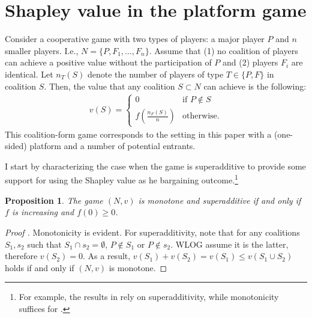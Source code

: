 \documentclass[a4paper]{article}
\newtheorem{proposition}{Proposition}
\begin{document}


\appendix

\printbibliography


\section{Shapley value in the platform game}

Consider a cooperative game with two types of players: a major player $P$ and $n$ smaller players.
I.e., $N = \{P, F_1, \dots, F_n\}$.
Assume that (1) no coalition of players can achieve a positive value without the participation of $P$ and (2) players $F_i$ are identical.
Let $n_T(S)$ denote the number of players of type $T \in \{P, F\}$ in coalition $S$. Then, the value that any coalition $S \subset N$ can achieve is the following:
\begin{align*}
    v(S) = \begin{cases}
        0                              & \text{if } P \notin S \\
        f\left(\frac{n_F(S)}{n}\right) & \text{otherwise}.
    \end{cases}
\end{align*}
This coalition-form game corresponds to the setting in this paper with a (one-sided) platform and a number of potential entrants.

I start by characterizing the case when the game is superadditive to provide some support for using the Shapley value as he bargaining outcome.\footnote{For example, the results in \textcite{gul1989bargaining} rely on superadditivity, while monotonicity suffices for \textcite[]{hart1996bargaining}.}

\begin{proposition}
    \label{prop:monotone}
    The game $(N, v)$ is monotone and superadditive if and only if $f$ is increasing and $f(0) \geq 0$. %
\end{proposition}

\begin{proof}[Proof%
    ]
    Monotonicity is evident. For superadditivity, note that for any coalitions $S_1, s_2$ such that $S_1 \cap s_2 = \emptyset$, $P \notin S_1$ or $P \notin s_2$. WLOG assume it is the latter, therefore $v(S_2) = 0$. As a result, $v(S_1) + v(S_2) = v(S_1) \leq v(S_1 \cup S_2)$ holds if and only if $(N, v)$ is monotone.
\end{proof}
\end{document}
